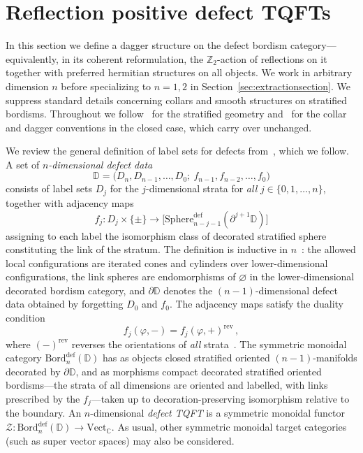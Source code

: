 \documentclass[11pt]{article}
\theoremstyle{definition}
\newcommand{\cZ}{\mathcal{Z}}
\newcommand{\bC}{\mathbb{C}}
\newcommand{\bZ}{\mathbb{Z}}
\newcommand{\bD}{\mathbb{D}}
\newcommand{\Bord}{\mathrm{Bord}}
\newcommand{\Vect}{\mathrm{Vect}}
\begin{document}
\section{Reflection positive defect TQFTs}
\label{sec:proposal}

In this section we define a dagger structure on the defect bordism category---equivalently, in its coherent reformulation, the $\bZ_2$-action of reflections on it together with preferred hermitian structures on all objects. We work in arbitrary dimension $n$ before specializing to $n = 1, 2$ in Section~\ref{sec:extractionsection}. We suppress standard details concerning collars and smooth structures on stratified bordisms. Throughout we follow~\cite{CRS18} for the stratified geometry and~\cite[\S 5]{Ste23} for the collar and dagger conventions in the closed case, which carry over unchanged.

We review the general definition of label sets for defects from~\cite[\S 2]{CRS18}, which we follow. A set of \emph{$n$-dimensional defect data}
\begin{equation}
  \bD = \big(D_n, D_{n-1}, \dots, D_0;\ f_{n-1}, f_{n-2}, \dots, f_0\big)
\end{equation}
consists of label sets $D_j$ for the $j$-dimensional strata for \emph{all} $j \in \{0, 1, \dots, n\}$, together with adjacency maps
\begin{equation}
  f_j \colon D_j \times \{\pm\} \longrightarrow \big[\mathrm{Sphere}^{\textrm{def}}_{n-j-1}(\partial^{j+1}\bD)\big]
\end{equation}
assigning to each label the isomorphism class of decorated stratified sphere constituting the link of the stratum. The definition is inductive in $n$~\cite[Definitions~2.1 and~2.4]{CRS18}: the allowed local configurations are iterated cones and cylinders over lower-dimensional configurations, the link spheres are endomorphisms of $\varnothing$ in the lower-dimensional decorated bordism category, and $\partial\bD$ denotes the $(n-1)$-dimensional defect data obtained by forgetting $D_0$ and $f_0$. The adjacency maps satisfy the duality condition
\begin{equation}
\label{eq:CRSduality}
  f_j(\varphi, -) = f_j(\varphi, +)^{\mathrm{rev}} \, ,
\end{equation}
where $(-)^{\mathrm{rev}}$ reverses the orientations of \emph{all} strata~\cite[eq.~(2.21)]{CRS18}. The symmetric monoidal category $\Bord_n^{\textrm{def}}(\bD)$ has as objects closed stratified oriented $(n-1)$-manifolds decorated by $\partial\bD$, and as morphisms compact decorated stratified oriented bordisms---the strata of all dimensions are oriented and labelled, with links prescribed by the $f_j$---taken up to decoration-preserving isomorphism relative to the boundary. An $n$-dimensional \emph{defect TQFT} is a symmetric monoidal functor $\cZ \colon \Bord_n^{\textrm{def}}(\bD) \to \Vect_\bC$. As usual, other symmetric monoidal target categories (such as super vector spaces) may also be considered. 
\end{document}
